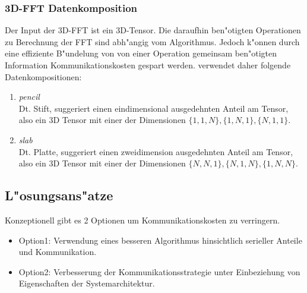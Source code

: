 \subsubsection{3D-FFT Datenkomposition}
Der Input der 3D-FFT ist ein 3D-Tensor. Die daraufhin ben"otigten Operationen zu Berechnung der FFT sind abh"angig vom Algorithmus. Jedoch k"onnen durch eine effiziente B"undelung von von einer Operation gemeinsam ben"otigten Information Kommunikationskosten gespart werden.
\cite{mainpaper} verwendet daher folgende Datenkompositionen:
\begin{enumerate}
	\item \textit{pencil}\\
		Dt. Stift, suggeriert einen eindimensional ausgedehnten Anteil am Tensor, also ein 3D Tensor mit einer der Dimensionen $\{1,1,N\},\{1,N,1\},\{N,1,1\}$.
	\item \textit{slab}\\
		Dt. Platte, suggeriert einen zweidimension ausgedehnten Anteil am Tensor, also ein 3D Tensor mit einer der Dimensionen $\{N,N,1\},\{N,1,N\},\{1,N,N\}$.
\end{enumerate}

\subsection{L"osungsans"atze}
Konzeptionell gibt es 2 Optionen um Kommunikationskosten zu verringern.
\begin{itemize}
	\item Option1: Verwendung eines besseren Algorithmus hinsichtlich serieller Anteile und Kommunikation.
	\item Option2: Verbesserung der Kommunikationsstrategie unter Einbeziehung von Eigenschaften der Systemarchitektur.
\end{itemize}

